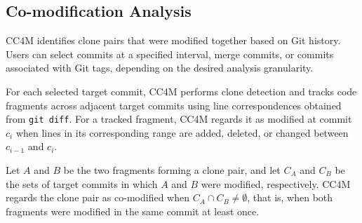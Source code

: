 \documentclass[conference]{IEEEtran}
\begin{document}

\subsection{Co-modification Analysis}
\label{sec:comodification}

\textsc{CC4M} identifies clone pairs that were modified together based on
Git history.
Users can select commits at a specified interval, merge commits, or
commits associated with Git tags, depending on the desired analysis
granularity.

For each selected target commit, \textsc{CC4M} performs clone detection and
tracks code fragments across adjacent target commits using line
correspondences obtained from \texttt{git diff}. For a tracked fragment,
\textsc{CC4M} regards it as modified at commit $c_i$ when lines in its
corresponding range are added, deleted, or changed between $c_{i-1}$
and $c_i$.

Let $A$ and $B$ be the two fragments forming a clone pair, and let
$C_A$ and $C_B$ be the sets of target commits in which $A$ and $B$ were
modified, respectively. \textsc{CC4M} regards the clone pair as co-modified
when $C_A \cap C_B \neq \emptyset$, that is, when both fragments were
modified in the same commit at least once.



\end{document}
